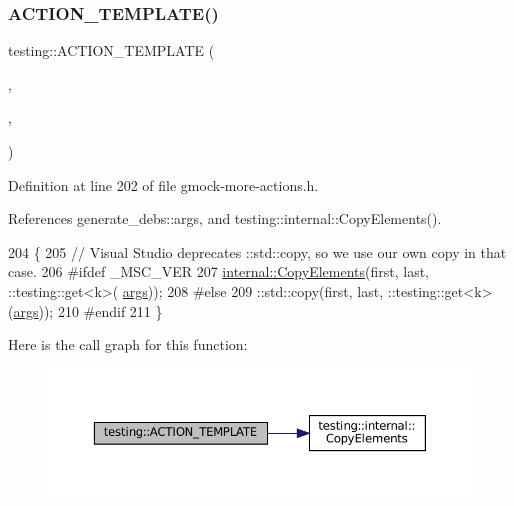 \subsubsection{\texorpdfstring{A\+C\+T\+I\+O\+N\+\_\+\+T\+E\+M\+P\+L\+A\+T\+E()}{ACTION\_TEMPLATE()}\hspace{0.1cm}{\footnotesize\ttfamily [5/28]}}
{\footnotesize\ttfamily testing\+::\+A\+C\+T\+I\+O\+N\+\_\+\+T\+E\+M\+P\+L\+A\+TE (\begin{DoxyParamCaption}\item[{Set\+Array\+Argument}]{,  }\item[{H\+A\+S\+\_\+1\+\_\+\+T\+E\+M\+P\+L\+A\+T\+E\+\_\+\+P\+A\+R\+A\+MS(int, k)}]{,  }\item[{A\+N\+D\+\_\+2\+\_\+\+V\+A\+L\+U\+E\+\_\+\+P\+A\+R\+A\+MS(first, last)}]{ }\end{DoxyParamCaption})}



Definition at line 202 of file gmock-\/more-\/actions.\+h.



References generate\+\_\+debs\+::args, and testing\+::internal\+::\+Copy\+Elements().


\begin{DoxyCode}
204                                                  \{
205   \textcolor{comment}{// Visual Studio deprecates ::std::copy, so we use our own copy in that case.}
206 \textcolor{preprocessor}{#ifdef \_MSC\_VER}
207   \hyperlink{namespacetesting_1_1internal_a9372c12747bcf964aacb1284f8048cae}{internal::CopyElements}(first, last, ::testing::get<k>(
      \hyperlink{namespacegenerate__debs_a75f9143e38df82d83b2e8a6f99cae02c}{args}));
208 \textcolor{preprocessor}{#else}
209   ::std::copy(first, last, ::testing::get<k>(\hyperlink{namespacegenerate__debs_a75f9143e38df82d83b2e8a6f99cae02c}{args}));
210 \textcolor{preprocessor}{#endif}
211 \}
\end{DoxyCode}
Here is the call graph for this function\+:
\nopagebreak
\begin{figure}[H]
\begin{center}
\leavevmode
\includegraphics[width=350pt]{namespacetesting_a2b0f090219db3bb0630d5ce6f7d911d8_cgraph}
\end{center}
\end{figure}
\mbox{\label{namespacetesting_a37a5ebfe68fd8dedf8bd82a5ebddcb7b}} 
